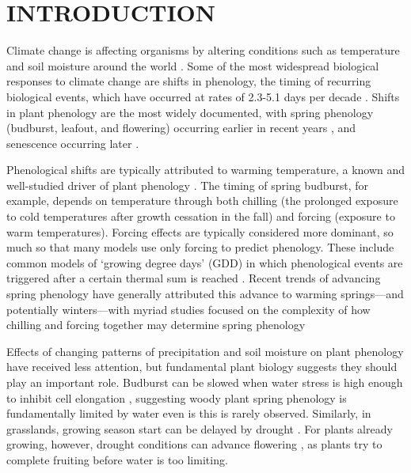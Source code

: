 \documentclass{article}
\begin{document}
\newpage
\section* {INTRODUCTION} 
\par Climate change is affecting organisms by altering conditions such as temperature and soil moisture around the world \citep{parmesan2006,chen2011}. Some of the most widespread biological responses to climate change are shifts in phenology, the timing of recurring biological events, which have occurred at rates of 2.3-5.1 days per decade \citep{parmesan2006,poloczanska2013,root2003}. Shifts in plant phenology are the most widely documented, with spring phenology (budburst, leafout, and flowering) occurring earlier in recent years \citep{wolkovich2012}, and senescence occurring later \citep{taylor2008,delpierre2009}. 

\par Phenological shifts are typically attributed to warming temperature, a known and well-studied driver of plant phenology \citep[e.g.,][]{cleland2007, piao2019plant}. The timing of spring budburst, for example, depends on temperature through both chilling (the prolonged exposure to cold temperatures after growth cessation in the fall) and forcing (exposure to warm temperatures). Forcing effects are typically considered more dominant, so much so that many models use only forcing to predict phenology. These include common models of `growing degree days' (GDD) in which phenological events are triggered after a certain thermal sum is reached \citep[e.g., ][]{olsson2014process}. Recent trends of advancing spring phenology have generally attributed this advance to warming springs---and potentially winters---with myriad studies focused on the complexity of how chilling and forcing together may determine spring phenology \citep{fujisawa2010, ibanez2010,cook2012b}

\par Effects of changing patterns of precipitation and soil moisture on plant phenology have received less attention, but fundamental plant biology suggests they should play an important role. Budburst can be slowed when water stress is high enough to inhibit cell elongation \citep{essiamah1986}, suggesting woody plant spring phenology is fundamentally limited by water even is this is rarely observed. Similarly, in grasslands, growing season start can be delayed by drought \cite{cui2017}. For plants already growing, however, drought conditions can advance flowering  \citep{hamann2018}, as plants try to complete fruiting before water is too limiting. 
\end{document}
